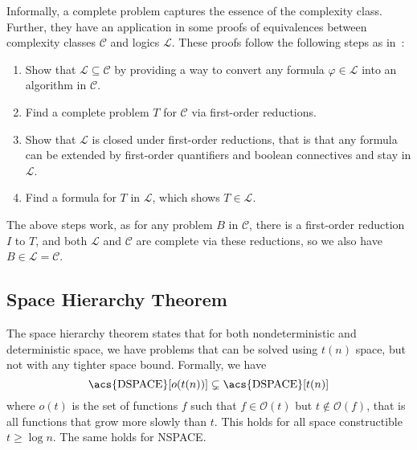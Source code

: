 Informally, a complete problem captures the essence of the complexity class.
Further, they have an application in some proofs of equivalences between complexity classes $\mathcal{C}$ and logics $\mathcal{L}$.
These proofs follow the following steps as in~\cite{descriptive-complexity}:
\begin{enumerate}
    \item Show that $\mathcal{L} \subseteq \mathcal{C}$ by providing a way to convert any formula $\varphi \in \mathcal{L}$ into an algorithm in $\mathcal{C}$.
    \item Find a complete problem $T$ for $\mathcal{C}$ via first-order reductions.
    \item Show that $\mathcal{L}$ is closed under first-order reductions, that is that any formula can be extended by first-order quantifiers and boolean connectives and stay in $\mathcal{L}$.
    \item Find a formula for $T$ in $\mathcal{L}$, which shows $T \in \mathcal{L}$.
\end{enumerate}
The above steps work, as for any problem $B$ in $\mathcal{C}$, there is a first-order reduction $I$ to $T$, and both $\mathcal{L}$ and $\mathcal{C}$ are complete via these reductions, so we also have $B \in \mathcal{L} = \mathcal{C}$.

\subsection{Space Hierarchy Theorem}\label{subsec:space-hierarchy-theorem}

The space hierarchy theorem states that for both nondeterministic and deterministic space, we have problems that can be solved using $t(n)$ space, but not with any tighter space bound.
Formally, we have
\[
    \text{\acs{DSPACE}}[o(t(n))] \subsetneq \text{\acs{DSPACE}}[t(n)]
\]
where $o(t)$ is the set of functions $f$ such that $f \in \mathcal{O}(t)$ but $t \not \in \mathcal{O}(f)$, that is all functions that grow more slowly than $t$.
This holds for all space constructible $t \geq \log n$.
The same holds for \acs{NSPACE}\@.

